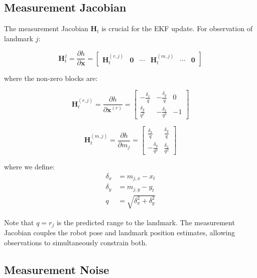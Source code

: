 \documentclass[12pt,a4paper]{article}
\newcommand{\state}{\bm{x}}
\begin{document}
\subsection{Measurement Jacobian}

The measurement Jacobian $\bm{H}_t$ is crucial for the EKF update. For observation of landmark $j$:

\begin{equation}
    \bm{H}_t^j = \frac{\partial h}{\partial \state} = \begin{bmatrix}
        \bm{H}_t^{(r,j)} & \bm{0} & \cdots & \bm{H}_t^{(m,j)} & \cdots & \bm{0}
    \end{bmatrix}
\end{equation}

where the non-zero blocks are:

\begin{equation}
    \bm{H}_t^{(r,j)} = \frac{\partial h}{\partial \state^{(r)}} = \begin{bmatrix}
        -\frac{\delta_x}{q} & -\frac{\delta_y}{q} & 0 \\
        \frac{\delta_y}{q^2} & -\frac{\delta_x}{q^2} & -1
    \end{bmatrix}
    \label{eq:H_robot}
\end{equation}

\begin{equation}
    \bm{H}_t^{(m,j)} = \frac{\partial h}{\partial m_j} = \begin{bmatrix}
        \frac{\delta_x}{q} & \frac{\delta_y}{q} \\
        -\frac{\delta_y}{q^2} & \frac{\delta_x}{q^2}
    \end{bmatrix}
    \label{eq:H_landmark}
\end{equation}

where we define:
\begin{align}
    \delta_x &= m_{j,x} - x_t \\
    \delta_y &= m_{j,y} - y_t \\
    q &= \sqrt{\delta_x^2 + \delta_y^2}
\end{align}

Note that $q = r_j$ is the predicted range to the landmark. The measurement Jacobian couples the robot pose and landmark position estimates, allowing observations to simultaneously constrain both.

\subsection{Measurement Noise}
\end{document}
